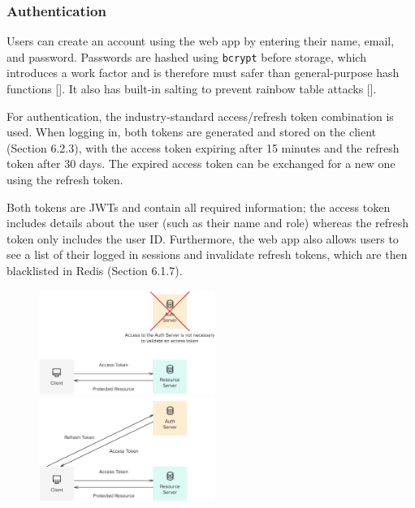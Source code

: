 \documentclass{article}
\begin{document}
\subsubsection{Authentication}

Users can create an account using the web app by entering their name, email, and password. Passwords are hashed using \texttt{bcrypt} before storage, which introduces a work factor and is therefore must safer than general-purpose hash functions []. It also has built-in salting to prevent rainbow table attacks [].

For authentication, the industry-standard access/refresh token combination is used. When logging in, both tokens are generated and stored on the client (Section 6.2.3), with the access token expiring after 15 minutes and the refresh token after 30 days. The expired access token can be exchanged for a new one using the refresh token.

Both tokens are JWTs and contain all required information; the access token includes details about the user (such as their name and role) whereas the refresh token only includes the user ID. Furthermore, the web app also allows users to see a list of their logged in sessions and invalidate refresh tokens, which are then blacklisted in Redis (Section 6.1.7).

\begin{figure}
	\centering
	\begin{minipage}{.47\textwidth}
		\centering
		\includegraphics[width=5.75cm]{access-token.png}
	\end{minipage}%
	\hspace{.5cm}
	\begin{minipage}{.47\textwidth}
		\centering
		\includegraphics[width=5.75cm]{refresh-token.png}
	\end{minipage}
\end{figure}
\end{document}
